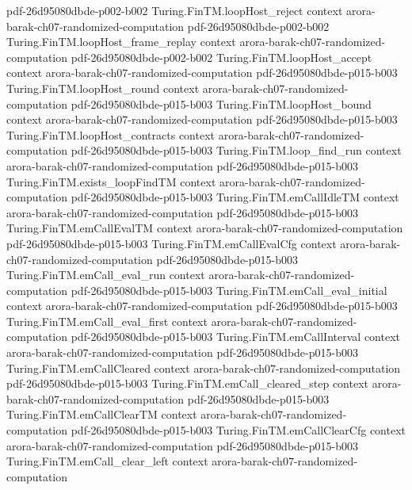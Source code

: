 \begin{theorem}
  {pdf-26d95080dbde-p002-b002}
\proofstep
  {Turing.FinTM.loopHost_reject}
  {context}
  {arora-barak-ch07-randomized-computation}
  {pdf-26d95080dbde-p002-b002}
\proofstep
  {Turing.FinTM.loopHost_frame_replay}
  {context}
  {arora-barak-ch07-randomized-computation}
  {pdf-26d95080dbde-p002-b002}
\proofstep
  {Turing.FinTM.loopHost_accept}
  {context}
  {arora-barak-ch07-randomized-computation}
  {pdf-26d95080dbde-p015-b003}
\proofstep
  {Turing.FinTM.loopHost_round}
  {context}
  {arora-barak-ch07-randomized-computation}
  {pdf-26d95080dbde-p015-b003}
\proofstep
  {Turing.FinTM.loopHost_bound}
  {context}
  {arora-barak-ch07-randomized-computation}
  {pdf-26d95080dbde-p015-b003}
\proofstep
  {Turing.FinTM.loopHost_contracts}
  {context}
  {arora-barak-ch07-randomized-computation}
  {pdf-26d95080dbde-p015-b003}
\proofstep
  {Turing.FinTM.loop_find_run}
  {context}
  {arora-barak-ch07-randomized-computation}
  {pdf-26d95080dbde-p015-b003}
\proofstep
  {Turing.FinTM.exists_loopFindTM}
  {context}
  {arora-barak-ch07-randomized-computation}
  {pdf-26d95080dbde-p015-b003}
\proofstep
  {Turing.FinTM.emCallIdleTM}
  {context}
  {arora-barak-ch07-randomized-computation}
  {pdf-26d95080dbde-p015-b003}
\proofstep
  {Turing.FinTM.emCallEvalTM}
  {context}
  {arora-barak-ch07-randomized-computation}
  {pdf-26d95080dbde-p015-b003}
\proofstep
  {Turing.FinTM.emCallEvalCfg}
  {context}
  {arora-barak-ch07-randomized-computation}
  {pdf-26d95080dbde-p015-b003}
\proofstep
  {Turing.FinTM.emCall_eval_run}
  {context}
  {arora-barak-ch07-randomized-computation}
  {pdf-26d95080dbde-p015-b003}
\proofstep
  {Turing.FinTM.emCall_eval_initial}
  {context}
  {arora-barak-ch07-randomized-computation}
  {pdf-26d95080dbde-p015-b003}
\proofstep
  {Turing.FinTM.emCall_eval_first}
  {context}
  {arora-barak-ch07-randomized-computation}
  {pdf-26d95080dbde-p015-b003}
\proofstep
  {Turing.FinTM.emCallInterval}
  {context}
  {arora-barak-ch07-randomized-computation}
  {pdf-26d95080dbde-p015-b003}
\proofstep
  {Turing.FinTM.emCallCleared}
  {context}
  {arora-barak-ch07-randomized-computation}
  {pdf-26d95080dbde-p015-b003}
\proofstep
  {Turing.FinTM.emCall_cleared_step}
  {context}
  {arora-barak-ch07-randomized-computation}
  {pdf-26d95080dbde-p015-b003}
\proofstep
  {Turing.FinTM.emCallClearTM}
  {context}
  {arora-barak-ch07-randomized-computation}
  {pdf-26d95080dbde-p015-b003}
\proofstep
  {Turing.FinTM.emCallClearCfg}
  {context}
  {arora-barak-ch07-randomized-computation}
  {pdf-26d95080dbde-p015-b003}
\proofstep
  {Turing.FinTM.emCall_clear_left}
  {context}
  {arora-barak-ch07-randomized-computation}

\end{theorem}

